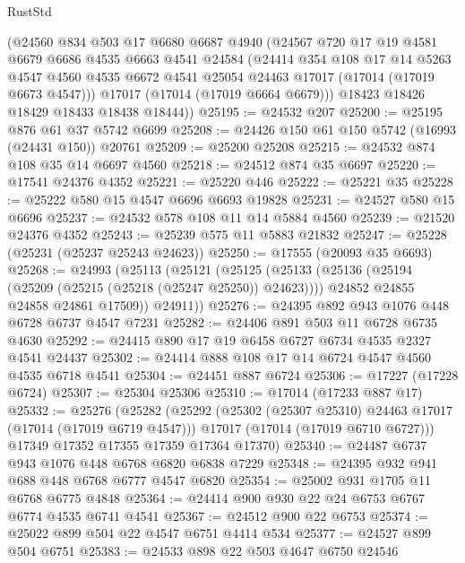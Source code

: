 \begin{lexlean}{RustStd}
\begin{coremodule}
{\begin{coremodule}
{{{{{{{{{{{{{{{{{{{{{{{{{{{{{{{{{{{{{{{{{{{{{{{{{{{{{{{      (@24560
        @834
        @503
        @17
        @6680
        @6687
        @4940
        (@24567
          @720
          @17
          @19
          @4581
          @6679
          @6686
          @4535
          @6663
          @4541
          @24584
          (@24414
            @354
            @108
            @17
            @14
            @5263
            @4547
            @4560
            @4535
            @6672
            @4541
            @25054
            @24463
            @17017
            (@17014 (@17019 @6673 @4547)))
          @17017
          (@17014 (@17019 @6664 @6679)))
        @18423
        @18426
        @18429
        @18433
        @18438
        @18444))
@25195 := @24532 @207
@25200 := @25195 @876 @61 @37 @5742 @6699
@25208 := @24426 @150 @61 @150 @5742 (@16993 (@24431 @150)) @20761
@25209 := @25200 @25208
@25215 := @24532 @874 @108 @35 @14 @6697 @4560
@25218 := @24512 @874 @35 @6697
@25220 := @17541 @24376 @4352
@25221 := @25220 @446
@25222 := @25221 @35
@25228 := @25222 @580 @15 @4547 @6696 @6693 @19828
@25231 := @24527 @580 @15 @6696
@25237 := @24532 @578 @108 @11 @14 @5884 @4560
@25239 := @21520 @24376 @4352
@25243 := @25239 @575 @11 @5883 @21832
@25247 := @25228 (@25231 (@25237 @25243 @24623))
@25250 := @17555 (@20093 @35 @6693)
@25268 := @24993
    (@25113
      (@25121
        (@25125
          (@25133
            (@25136 (@25194 (@25209 (@25215 (@25218 (@25247 @25250)) @24623))))
            @24852
            @24855
            @24858
            @24861
            @17509))
        @24911))
@25276 := @24395 @892 @943 @1076 @448 @6728 @6737 @4547 @7231
@25282 := @24406 @891 @503 @11 @6728 @6735 @4630
@25292 := @24415 @890 @17 @19 @6458 @6727 @6734 @4535 @2327 @4541 @24437
@25302 := @24414 @888 @108 @17 @14 @6724 @4547 @4560 @4535 @6718 @4541
@25304 := @24451 @887 @6724
@25306 := @17227 (@17228 @6724)
@25307 := @25304 @25306
@25310 := @17014 (@17233 @887 @17)
@25332 := @25276
    (@25282
      (@25292
        (@25302 (@25307 @25310) @24463 @17017 (@17014 (@17019 @6719 @4547)))
        @17017
        (@17014 (@17019 @6710 @6727)))
      @17349
      @17352
      @17355
      @17359
      @17364
      @17370)
@25340 := @24487 @6737 @943 @1076 @448 @6768 @6820 @6838 @7229
@25348 := @24395 @932 @941 @688 @448 @6768 @6777 @4547 @6820
@25354 := @25002 @931 @1705 @11 @6768 @6775 @4848
@25364 := @24414 @900 @930 @22 @24 @6753 @6767 @6774 @4535 @6741 @4541
@25367 := @24512 @900 @22 @6753
@25374 := @25022 @899 @504 @22 @4547 @6751 @4414 @534
@25377 := @24527 @899 @504 @6751
@25383 := @24533 @898 @22 @503 @4647 @6750 @24546
}}}}}}}}}}}}}}}}}}}}}}}}}}}}}}}}}}}}}}}}}}}}}}}}}}}}}}}
\end{coremodule}}
\end{coremodule}
\end{lexlean}

